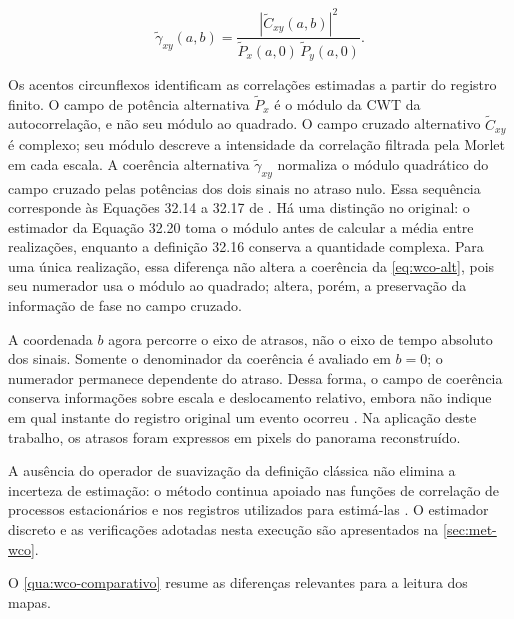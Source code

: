 \begin{equation}\label{eq:wco-alt}
  \widetilde\gamma_{xy}(a,b)=
  \frac{|\widetilde C_{xy}(a,b)|^2}
       {\widetilde P_x(a,0)\,\widetilde P_y(a,0)}.
\end{equation}

\noindent
Os acentos circunflexos identificam as correlações estimadas a partir do registro
finito. O campo de potência alternativa $\widetilde P_x$ é o módulo da CWT da
autocorrelação, e não seu módulo ao quadrado. O campo cruzado alternativo
$\widetilde C_{xy}$ é complexo; seu módulo descreve a intensidade da correlação
filtrada pela Morlet em cada escala. A coerência alternativa
$\widetilde\gamma_{xy}$ normaliza o módulo quadrático do campo cruzado pelas
potências dos dois sinais no atraso nulo. Essa sequência corresponde às
Equações 32.14 a 32.17 de . Há uma distinção no
original: o estimador da Equação 32.20 toma o módulo antes de calcular a
média entre realizações, enquanto a definição 32.16 conserva a quantidade
complexa. Para uma única realização, essa diferença não altera a coerência
da \autoref{eq:wco-alt}, pois seu numerador usa o módulo ao quadrado;
altera, porém, a preservação da informação de fase no campo cruzado.

A coordenada $b$ agora percorre o eixo de atrasos, não o eixo de tempo absoluto
dos sinais. Somente o denominador da coerência é avaliado em $b=0$; o numerador
permanece dependente do atraso. Dessa forma, o campo de coerência conserva
informações sobre escala e deslocamento relativo, embora não indique em qual
instante do registro original um evento ocorreu \cite{schuck2019}. Na aplicação
deste trabalho, os atrasos foram expressos em pixels do panorama reconstruído.

A ausência do operador de suavização da definição clássica não elimina a
incerteza de estimação: o método continua apoiado nas funções de correlação de
processos estacionários e nos registros utilizados para estimá-las
\cite{schuck2019}. O estimador discreto e as verificações adotadas nesta execução
são apresentados na \autoref{sec:met-wco}.

O \autoref{qua:wco-comparativo} resume as diferenças relevantes para a leitura
dos mapas.


